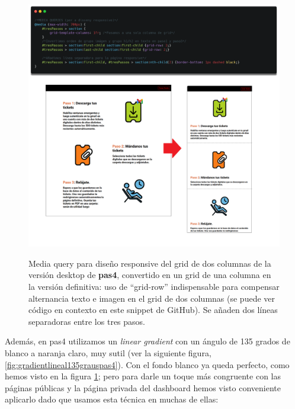 \documentclass[a4paper,12pt]{report}
\begin{document}
	\FloatBarrier
	\setlength{\belowcaptionskip}{3pt}
	\begin{figure}[H]
		\centering
		\caption{Media query para diseño responsive del grid de dos columnas de la versión desktop de \textbf{pas4}, convertido en un grid de una columna en la versión definitiva: uso de ``grid-row'' indispensable para compensar alternancia texto e imagen en el grid de dos columnas (se puede ver código en contexto en este snippet de GitHub). Se añaden dos líneas separadoras entre los tres pasos.}
		\includegraphics[width=1\linewidth]{img/pas4grid1col}
		\label{fig:pas4grid1col}
	\end{figure}
	\FloatBarrier
	
	Además, en pas4 utilizamos un \textit{linear gradient} con un ángulo de 135 grados de blanco a naranja claro, muy sutil (ver la siguiente figura, \ref{fig:gradientlineal135grauspas4}). Con el fondo blanco ya queda perfecto, como hemos visto en la figura \ref{fig:pas4grid1col}; pero para darle un toque más congruente con las páginas públicas y la página privada del dashboard hemos visto conveniente aplicarlo dado que usamos esta técnica en muchas de ellas:
	
\end{document}
